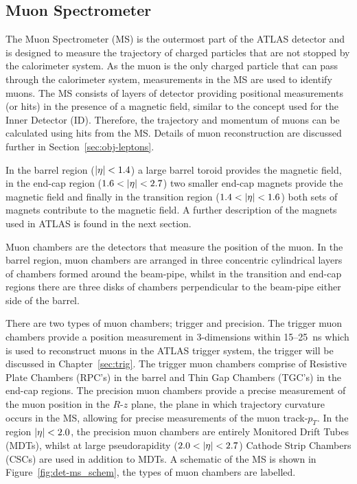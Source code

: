 \FloatBarrier
\subsection{Muon Spectrometer}
\label{sec:det-MS}

The Muon Spectrometer (MS) is the outermost part of the ATLAS detector and is designed to measure the trajectory
of charged particles that are not stopped by the calorimeter system.
As the muon is the only charged particle that can pass through the calorimeter system,
measurements in the MS are used to identify muons.
The MS consists of layers of detector providing positional measurements (or hits)
in the presence of a magnetic field, similar to the concept used for the Inner Detector (ID).
Therefore, the trajectory and momentum of muons can be calculated using hits from the MS.
Details of muon reconstruction are discussed further in Section~\ref{sec:obj-leptons}.

In the barrel region ($|\eta|\nobreak<\nobreak1.4$) a large barrel toroid provides the magnetic field,
in the end-cap region ($1.6\nobreak<\nobreak|\eta|\nobreak<\nobreak2.7$) two smaller end-cap magnets  provide the magnetic field
and finally in the transition region ($1.4\nobreak<\nobreak|\eta|\nobreak<\nobreak1.6$) both sets of magnets contribute to the magnetic field.
A further description of the magnets used in ATLAS is found in the next section. 

Muon chambers are the detectors that measure the position of the muon.
In the barrel region,  muon chambers are arranged in three concentric cylindrical layers of chambers formed around the beam-pipe,
whilst in the transition and end-cap regions there are three disks of chambers perpendicular to the beam-pipe either side of the barrel.

There are two types of muon chambers; trigger and precision.
The trigger muon chambers provide a position measurement in 3-dimensions within 15--\SI{25}{\nano\second} which is used to reconstruct muons in the ATLAS trigger system,
the trigger will be discussed in Chapter~\ref{sec:trig}.
The trigger muon chambers comprise of Resistive Plate Chambers (RPC’s) in the barrel 
and Thin Gap Chambers (TGC’s) in the end-cap regions.
The precision muon chambers provide a precise measurement of the muon position in the $R$-$z$ plane,
the plane in which trajectory curvature occurs in the MS, allowing for precise measurements of the muon track-$p_T$. 
In the region $|\eta|\nobreak<\nobreak2.0$, the precision muon chambers are entirely Monitored Drift Tubes (MDTs),
whilst at large pseudorapidity ($2.0\nobreak<\nobreak|\eta|\nobreak<\nobreak2.7$) Cathode Strip Chambers (CSCs) are used in addition to MDTs.
A schematic of the MS is shown in Figure~\ref{fig:det-ms_schem}, the types of muon chambers are labelled.

